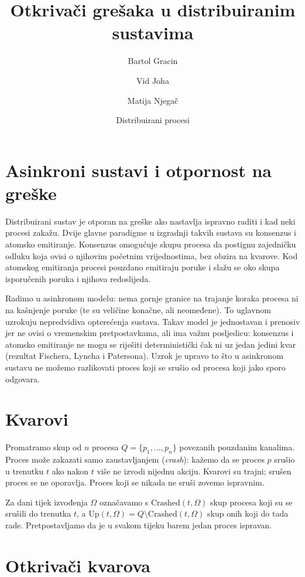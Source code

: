 \documentclass[11pt,a4paper]{article}
\title{Otkrivači grešaka u distribuiranim sustavima}
\author{Bartol Gracin \and Vid Joha \and Matija Njegač}
\date{Distribuirani procesi}
\newcommand{\Crashed}{\mathrm{Crashed}}
\newcommand{\Up}{\mathrm{Up}}
\begin{document}
\maketitle

\section{Asinkroni sustavi i otpornost na greške}

Distribuirani sustav je otporan na greške ako nastavlja ispravno raditi i kad
neki procesi zakažu. Dvije glavne paradigme u izgradnji takvih sustava su
konsenzus i atomsko emitiranje. Konsenzus omogućuje skupu procesa da postignu
zajedničku odluku koja ovisi o njihovim početnim vrijednostima, bez obzira na
kvarove. Kod atomskog emitiranja procesi pouzdano emitiraju poruke i slažu se
oko skupa isporučenih poruka i njihova redoslijeda.

Radimo u asinkronom modelu: nema gornje granice na trajanje koraka procesa ni na
kašnjenje poruke (te su veličine konačne, ali neomeđene). To uglavnom uzrokuju
nepredvidiva opterećenja sustava. Takav model je jednostavan i prenosiv jer ne
ovisi o vremenskim pretpostavkama, ali ima važnu posljedicu: konsenzus i atomsko
emitiranje ne mogu se riješiti deterministički čak ni uz jedan jedini kvar
(rezultat Fischera, Lyncha i Patersona). Uzrok je upravo to što u asinkronom
sustavu ne možemo razlikovati proces koji se srušio od procesa koji jako sporo
odgovara.

\section{Kvarovi}

Promatramo skup od $n$ procesa $Q = \{p_1, \dots, p_n\}$ povezanih pouzdanim
kanalima. Proces može zakazati samo zaustavljanjem (\emph{crash}): kažemo da se
proces $p$ srušio u trenutku $t$ ako nakon $t$ više ne izvodi nijednu akciju.
Kvarovi su trajni; srušen proces se ne oporavlja. Proces koji se nikada ne sruši
zovemo ispravnim.

Za dani tijek izvođenja $\Omega$ označavamo s $\Crashed(t,\Omega)$ skup procesa
koji su se srušili do trenutka $t$, a $\Up(t,\Omega) = Q \setminus
\Crashed(t,\Omega)$ skup onih koji do tada rade. Pretpostavljamo da je u svakom
tijeku barem jedan proces ispravan.

\section{Otkrivači kvarova}
\end{document}
